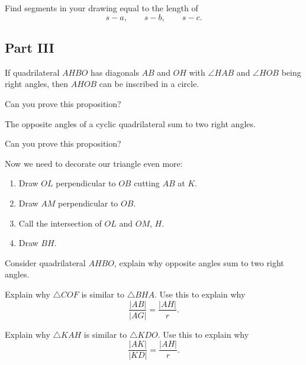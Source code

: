 \documentclass{ximera}
\begin{document}
\begin{question}
Find segments in your drawing equal to the length of 
\[
s-a,\qquad s-b,\qquad s-c.
\] 
\end{question}


\subsection*{Part III}

\begin{proposition}
If quadrilateral $AHBO$ has diagonals $AB$ and $OH$ with $\angle HAB$ and $\angle HOB$ being right angles, then $AHOB$ can be inscribed in a circle.
\end{proposition}

\begin{question}
Can you prove this proposition?
\end{question}

\begin{proposition}\label{P:cyclic}
The opposite angles of a cyclic quadrilateral sum to two right angles. 
\end{proposition}

\begin{question}
Can you prove this proposition?
\end{question}


\begin{question}
Now we need to decorate our triangle even more:
\begin{enumerate}
\item Draw $OL$ perpendicular to $OB$ cutting $AB$ at $K$. 
\item Draw $AM$ perpendicular to $OB$.
\item Call the intersection of $OL$ and $OM$, $H$. 
\item Draw $BH$. 
\end{enumerate}
Consider quadrilateral $AHBO$, explain why opposite angles sum to two right angles. 
\end{question}


\begin{question}
Explain why $\triangle COF$ is similar to $\triangle BHA$. Use this to explain why
\[
\frac{|AB|}{|AG|} = \frac{|AH|}{r}.
\]
\end{question}

\begin{question}
Explain why $\triangle KAH$ is similar to $\triangle KDO$. Use this to explain why
\[
\frac{|AK|}{|KD|} = \frac{|AH|}{r}.
\]
\end{question}
\end{document}
